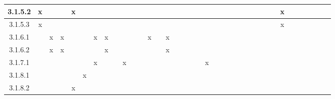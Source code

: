 \documentclass[titlepage]{article}
\begin{document}
\begin{center}
\begin{tabular}{ | c ||c | c | c | c | c | c | c | c | c | c | c | c | c | c | c | c | c | c | c | c | c | c | c | c | c | c | c | c | c | c | c | c | c | c | c |}
   3.1.5.2 &x& & &x& & & & & & & & & & & & & & & & & & & & & & & & &x& & & & & & \\ \hline
   3.1.5.3 &x& & & & & & & & & & & & & & & & & & & & & & & & & & & &x& & & & & & \\ \hline
   3.1.6.1 & &x&x& & &x&x& & & & &x& &x& & & & & & & & & & & & & & & & & & & & & \\ \hline
   3.1.6.2 & &x&x& & & &x& & & & & & &x& & & & & & & & & & & & & & & & & & & & & \\ \hline
   3.1.7.1 & & & & & &x& & &x& & & & & & & & & &x& & & & & & & & & & & & & & & & \\ \hline
   3.1.8.1 & & & & &x& & & & & & & & & & & & & & & & & & & & & & & & & & & & & & \\ \hline
   3.1.8.2 & & & &x& & & & & & & & & & & & & & & & & & & & & & & & & & & & & & & \\ \hline

\end{tabular}
\end{center}

\pagebreak
\end{document}
